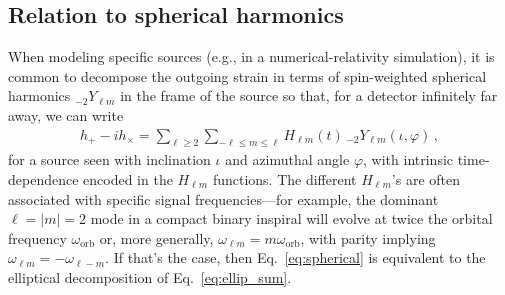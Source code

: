 \documentclass[aps,prd,twocolumn,superscriptaddress,preprintnumbers,floatfix,nofootinbib]{revtex4-2}
\begin{document}


\subsection{Relation to spherical harmonics}
\label{sec:harmonics}

When modeling specific sources (e.g., in a numerical-relativity simulation), it is common to decompose the outgoing strain in terms of spin-weighted spherical harmonics ${}_{-2} Y_{\ell m}$ in the frame of the source so that, for a detector infinitely far away, we can write
\begin{align} \label{eq:spherical}
h_+ - i h_\times = \sum_{\ell \geq 2} \sum_{-\ell \leq m \leq \ell} H_{\ell m}(t)\, {}_{-2}Y_{\ell m} (\iota, \varphi)\, ,
\end{align}
for a source seen with inclination $\iota$ and azimuthal angle $\varphi$, with intrinsic time-dependence encoded in the $H_{\ell m}$ functions.
The different $H_{\ell m}$'s are often associated with specific signal frequencies---for example, the dominant $\ell= |m|=2$ mode in a compact binary inspiral will evolve at twice the orbital frequency $\omega_\mathrm{orb}$ or, more generally, $\omega_{\ell m} = m \omega_\mathrm{orb}$, with parity implying $\omega_{\ell m}= - \omega_{\ell - m}$.
If that's the case, then Eq.~\eqref{eq:spherical} is equivalent to the elliptical decomposition of Eq.~\eqref{eq:ellip_sum}.
\end{document}
